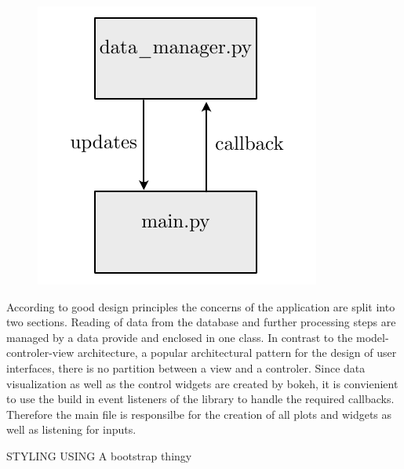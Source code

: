     \begin{figure}[h]
    \capstart
        \centering
    	\includegraphics{Abbildung/vis_architecture.pdf}

    	\begin{minipage}{\captionwidth}
    		\caption[vis archi]{ \newline }
    		\label{fig:db}
    	\end{minipage}
    \end{figure}

According to good design principles the concerns of the application are split into two sections. Reading of data from the database and further processing steps are managed by a data provide and enclosed in one class. In contrast to the model-controler-view architecture, a popular architectural pattern for the design of user interfaces, there is no partition between a view and a controler. Since data visualization as well as the control widgets are created by bokeh, it is convienient to use the build in event listeners of the library to handle the required callbacks. Therefore the main file is responsilbe for the creation of all plots and widgets as well as listening for inputs.

STYLING USING A bootstrap thingy

